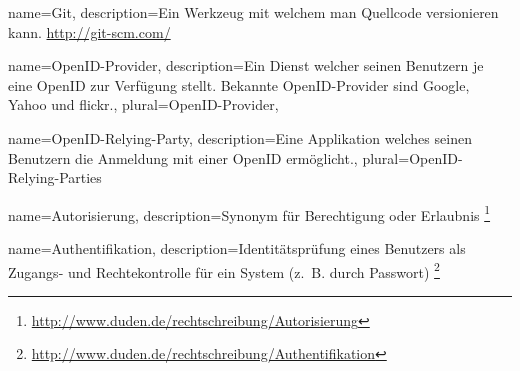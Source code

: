 {
  name=Git,
  description={Ein Werkzeug mit welchem man Quellcode versionieren kann. \url{http://git-scm.com/}}
}

{
  name=OpenID-Provider,
  description={Ein Dienst welcher seinen Benutzern je eine OpenID zur Verfügung stellt. Bekannte OpenID-Provider sind Google, Yahoo und flickr.},
  plural=OpenID-Provider,
}

{
  name=OpenID-Relying-Party,
  description={Eine Applikation welches seinen Benutzern die Anmeldung mit
               einer OpenID ermöglicht.},
  plural=OpenID-Relying-Parties 
}

{
  name=Autorisierung,
  description={Synonym für Berechtigung oder Erlaubnis \footnote{\url{http://www.duden.de/rechtschreibung/Autorisierung}}}
}

{
  name=Authentifikation,
  description={Identitätsprüfung eines Benutzers als Zugangs- und Rechtekontrolle für ein System (z. B. durch Passwort) \footnote{\url{http://www.duden.de/rechtschreibung/Authentifikation}}}
}

